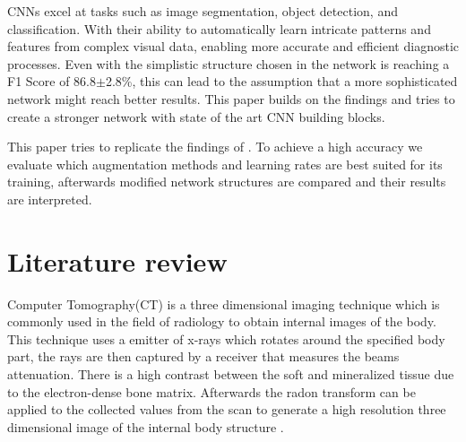 \documentclass[
a4paper, 
12pt,
grayscalebody, %
abstract=on,
twoside, BCOR10mm, 12pt, DIV13,headinclude, footexclude, final, abstracton, openright
]{ibireprt}
\numberwithin{equation}{chapter}
\numberwithin{table}{chapter}
\numberwithin{figure}{chapter}
\numberwithin{algorithm}{chapter}
\numberwithin{example}{chapter}
\numberwithin{example}{chapter}
\begin{document}
CNNs excel at tasks such as image segmentation, object detection, and classification. With their ability to automatically learn intricate patterns and features from complex visual data, enabling more accurate and efficient diagnostic processes. %
Even with the simplistic structure chosen in \cite{Walle2023} the network is reaching a F1 Score of 86.8$\pm$2.8\%, this can lead to the assumption that a more sophisticated network might reach better results. This paper builds on the findings and tries to create a stronger network with state of the art CNN building blocks.  

This paper tries to replicate the findings of \cite{Walle2023}. To achieve a high accuracy we evaluate which augmentation methods and learning rates are best suited for its training, afterwards modified network structures are  compared and their results are interpreted. 



\chapter{Literature review}

	Computer Tomography(CT) is a three dimensional imaging technique which is commonly used in the field of radiology  to obtain internal images of the body. This technique uses a emitter of x-rays which rotates around the specified body part, the rays are then captured by a receiver that measures the beams attenuation. There is a high contrast between the soft and mineralized tissue  due to the electron-dense bone matrix. Afterwards the radon transform can be applied to the collected values from the scan to generate a high resolution three dimensional image of the internal body structure \cite{Burghardt2011}.
\end{document}
